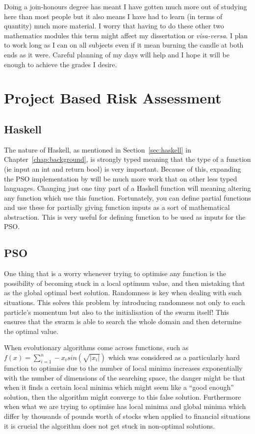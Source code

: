 \documentclass{pdfmx4020}
\begin{document}
    Doing a join-honours degree has meant I have gotten much more out of studying here than most people but it also means I have had to learn (in terms of quantity) much more material. I worry that having to do these other two mathematics modules this term might affect my dissertation or \textit{visa-versa}. I plan to work long as I can on all subjects even if it mean burning the candle at both ends as it were. Careful planning of my days will help and I hope it will be enough to achieve the grades I desire. 
  \section{Project Based Risk Assessment} %
  \label{sec:project_based}
    \subsection{Haskell} %
    \label{sub:haskell}
      The nature of Haskell, as mentioned in Section~\ref{sec:haskell} in Chapter~\ref{chap:background}, is strongly typed meaning that the type of a function (ie input an int and return bool) is very important. Because of this, expanding the PSO implementation by \cite{haskellPSO} will be much more work that on other less typed languages. Changing just one tiny part of a Haskell function will meaning altering any function which use this function. Fortunately, you can define partial functions and use these for partially giving function inputs as a sort of mathematical abstraction. This is very useful for defining function to be used as inputs for the PSO. 
    \subsection{PSO} %
    \label{sub:pso}
      One thing that is a worry whenever trying to optimise any function is the possibility of becoming stuck in a local optimum value, and then mistaking that as the global optimal best solution. Randomness is key when dealing with such situations. This solves this problem by introducing randomness not only to each particle's momentum but also to the initialisation of the swarm itself! This ensures that the swarm is able to search the whole domain and then determine the optimal value. 

      When evolutionary algorithms come across functions, such as $f(x)=\sum\limits_{i=1}^n -x_i sin(\sqrt{|x_i|})$ which was considered \cite{localmin} as a particularly hard function to optimise due to the number of local minima increases exponentially with the number of dimensions of the searching space, the danger might be that when it finds a certain local minima which might seem like a ``good enough'' solution, then the algorithm might converge to this false solution. Furthermore when what we are trying to optimise has local minima and global minima which differ by thousands of pounds worth of stocks when applied to financial situations it is crucial the algorithm does not get stuck in non-optimal solutions. 
\end{document}
